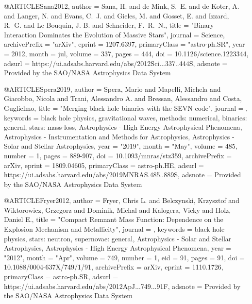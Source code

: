 \documentclass[twocolumn,tighten]{aastex63}
\begin{document}
@ARTICLE{Sana2012,
   author = {{Sana}, H. and {de Mink}, S.~E. and {de Koter}, A. and {Langer}, N. and 
	{Evans}, C.~J. and {Gieles}, M. and {Gosset}, E. and {Izzard}, R.~G. and 
	{Le Bouquin}, J.-B. and {Schneider}, F.~R.~N.},
    title = "{Binary Interaction Dominates the Evolution of Massive Stars}",
  journal = {Science},
archivePrefix = "arXiv",
   eprint = {1207.6397},
 primaryClass = "astro-ph.SR",
     year = 2012,
    month = jul,
   volume = 337,
    pages = {444},
      doi = {10.1126/science.1223344},
   adsurl = {https://ui.adsabs.harvard.edu/abs/2012Sci...337..444S},
  adsnote = {Provided by the SAO/NASA Astrophysics Data System}
}

@ARTICLE{Spera2019,
       author = {{Spera}, Mario and {Mapelli}, Michela and {Giacobbo}, Nicola and
         {Trani}, Alessandro A. and {Bressan}, Alessandro and {Costa}, Guglielmo},
        title = "{Merging black hole binaries with the SEVN code}",
      journal = {\mnras},
     keywords = {black hole physics, gravitational waves, methods: numerical, binaries: general, stars: mass-loss, Astrophysics - High Energy Astrophysical Phenomena, Astrophysics - Instrumentation and Methods for Astrophysics, Astrophysics - Solar and Stellar Astrophysics},
         year = "2019",
        month = "May",
       volume = {485},
       number = {1},
        pages = {889-907},
          doi = {10.1093/mnras/stz359},
archivePrefix = {arXiv},
       eprint = {1809.04605},
 primaryClass = {astro-ph.HE},
       adsurl = {https://ui.adsabs.harvard.edu/abs/2019MNRAS.485..889S},
      adsnote = {Provided by the SAO/NASA Astrophysics Data System}
}

@ARTICLE{Fryer2012,
       author = {{Fryer}, Chris L. and {Belczynski}, Krzysztof and
         {Wiktorowicz}, Grzegorz and {Dominik}, Michal and {Kalogera}, Vicky and
         {Holz}, Daniel E.},
        title = "{Compact Remnant Mass Function: Dependence on the Explosion Mechanism and Metallicity}",
      journal = {\apj},
     keywords = {black hole physics, stars: neutron, supernovae: general, Astrophysics - Solar and Stellar Astrophysics, Astrophysics - High Energy Astrophysical Phenomena},
         year = "2012",
        month = "Apr",
       volume = {749},
       number = {1},
          eid = {91},
        pages = {91},
          doi = {10.1088/0004-637X/749/1/91},
archivePrefix = {arXiv},
       eprint = {1110.1726},
 primaryClass = {astro-ph.SR},
       adsurl = {https://ui.adsabs.harvard.edu/abs/2012ApJ...749...91F},
      adsnote = {Provided by the SAO/NASA Astrophysics Data System}
}
\end{document}
